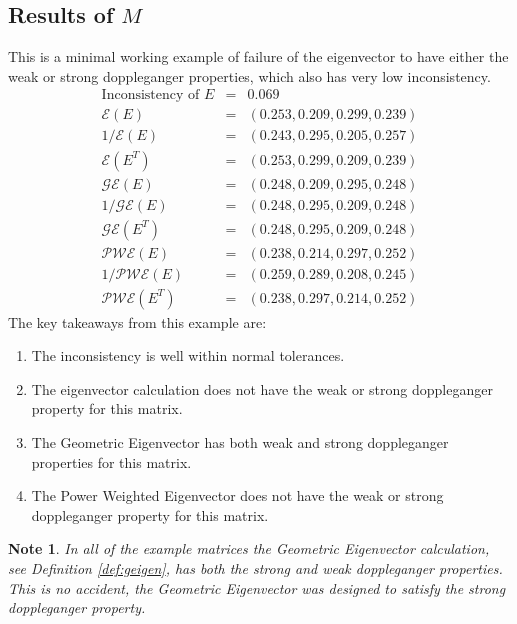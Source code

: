 \documentclass[11pt]{article}
\newtheorem{note}{Note}
\begin{document}
\subsection{Results of $M$}
This is a minimal working example of failure of the eigenvector to have either the weak 
or strong doppleganger properties, which also has very low inconsistency.
\begin{eqnarray*}
	\mbox{Inconsistency of } E &=& 0.069 \\
	\mathcal{E}(E) &=& ( 0.253,  0.209,  0.299 , 0.239) \\
	1/\mathcal{E}(E) &=& (  0.243,  0.295,  0.205,  0.257) \\
	\mathcal{E}(E^T) &=& (  0.253,  0.299,  0.209,  0.239) \\
	\mathcal{GE}(E) &=& ( 0.248,  0.209,  0.295,  0.248) \\
	1/\mathcal{GE}(E) &=& (  0.248,  0.295 , 0.209,  0.248) \\
	\mathcal{GE}(E^T) &=& (  0.248,  0.295 , 0.209,  0.248) \\
	\mathcal{PWE}(E) &=& ( 0.238,  0.214,  0.297,  0.252) \\
	1/\mathcal{PWE}(E) &=& (  0.259,  0.289,  0.208,  0.245) \\
	\mathcal{PWE}(E^T) &=& ( 0.238,  0.297,  0.214,  0.252)
\end{eqnarray*}
The key takeaways from this example are:
\begin{enumerate}
	\item The inconsistency is well within normal tolerances.
	\item The eigenvector calculation does not have the weak or strong doppleganger property for this matrix.
	\item The Geometric Eigenvector has both weak and strong doppleganger properties for this matrix.
	\item The Power Weighted Eigenvector does not have the weak or strong doppleganger property for this matrix.
\end{enumerate}

\begin{note}
In all of the example matrices the Geometric Eigenvector calculation, see Definition
\ref{def:geigen}, has both the strong and weak doppleganger properties.  This is
no accident, the Geometric Eigenvector was designed to satisfy the strong doppleganger
property.
\end{note}
\end{document}
